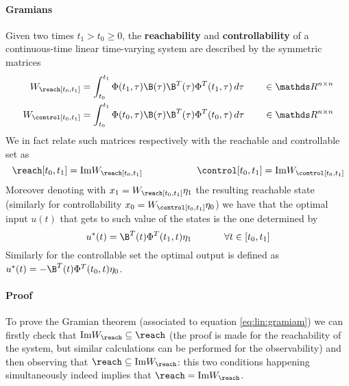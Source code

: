 	\paragraph{Gramians} Given two times $t_1 > t_0 \geq 0$, the  \textbf{reachability} and \textbf{controllability} of a continuous-time linear time-varying system are described by the symmetric matrices
	\begin{equation} \label{eq:lin:gramians}
	\begin{aligned}
		W_\reach[t_0,t_1] & = \int_{t_0}^{t_1} \Phi(t_1,\tau) \B(\tau) \B^T(\tau) \Phi^T(t_1,\tau) \, d\tau \qquad \in \mathds R^{n\times n} \\
		W_\control[t_0,t_1] & = \int_{t_0}^{t_1} \Phi(t_0,\tau) \B(\tau) \B^T(\tau) \Phi^T(t_0,\tau) \, d\tau \qquad \in \mathds R^{n\times n} 
	\end{aligned}
	\end{equation}
	We in fact relate such matrices respectively with the reachable and controllable set as
	\begin{equation} \label{eq:lin:gramiam}
		\reach[t_0,t_1] = \textrm{Im} W_\reach[t_0,t_1] \hspace{2cm}
		\control[t_0,t_1] = \textrm{Im} W_\control[t_0,t_1]
	\end{equation}
	Moreover denoting with $x_1 = W_\reach[t_0,t_1] \eta_1$ the resulting reachable state (similarly for controllability $x_0 = W_\control[t_0,t_1] \eta_0$) we have that the optimal input $u(t)$ that gets to such value of the states is the one determined by
	\begin{equation} \label{eq:lin:gramoptimalsolution}
		u^*(t) = \B^T(t) \Phi^T(t_1,t)\eta_1 \hspace{1.2cm} \forall t \in [t_0,t_1]
	\end{equation}
	Similarly for the controllable set the optimal output is defined as $u^*(t) = - \B^T(t) \Phi^T(t_0,t) \eta_0$.
		
	\paragraph{Proof} To prove the Gramian theorem (associated to equation \ref{eq:lin:gramiam}) we can firstly check that $\textrm{Im} W_\reach \subseteq \reach$ (the proof is made for the reachability of the system, but similar calculations can be performed for the observability) and then observing that $\reach \subseteq \textrm{Im} W_\reach$: this two conditions happening simultaneously indeed implies that $\reach = \textrm{Im} W_\reach$.	
		
